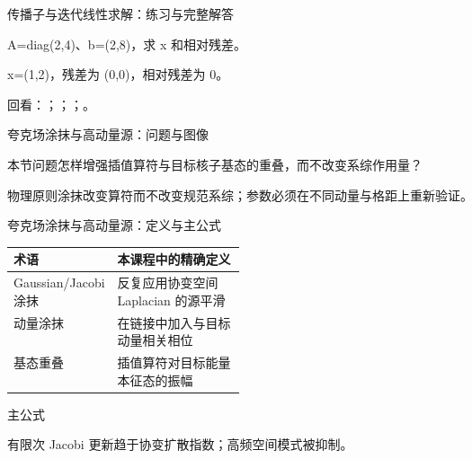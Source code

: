 \begin{frame}[t]{传播子与迭代线性求解：练习与完整解答}
\footnotesize
\begin{block}{}A=diag(2,4)、b=(2,8)，求 x 和相对残差。\end{block}
\begin{exampleblock}{}x=(1,2)，残差为 (0,0)，相对残差为 0。\end{exampleblock}
\vfill
\scriptsize 回看：；；；。
\end{frame}

\begin{frame}[t]{夸克场涂抹与高动量源：问题与图像}
\footnotesize
\begin{block}{本节问题}怎样增强插值算符与目标核子基态的重叠，而不改变系综作用量？\end{block}
\begin{block}{物理原则}\quad 涂抹改变算符而不改变规范系综；参数必须在不同动量与格距上重新验证。\end{block}
\end{frame}

\begin{frame}[t]{夸克场涂抹与高动量源：定义与主公式}
\footnotesize\begin{tabularx}{\linewidth}{p{0.30\linewidth}Y}
\toprule 术语 & 本课程中的精确定义\\\midrule
{} Gaussian/\allowbreak{}Jacobi 涂抹 & 反复应用协变空间 Laplacian 的源平滑\\
 动量涂抹 & 在链接中加入与目标动量相关相位\\
 基态重叠 & 插值算符对目标能量本征态的振幅\\
\bottomrule\end{tabularx}\vspace{0.15cm}
\begin{block}{ 主公式}\centering{}\end{block}
有限次 Jacobi 更新趋于协变扩散指数；高频空间模式被抑制。
\end{frame}

